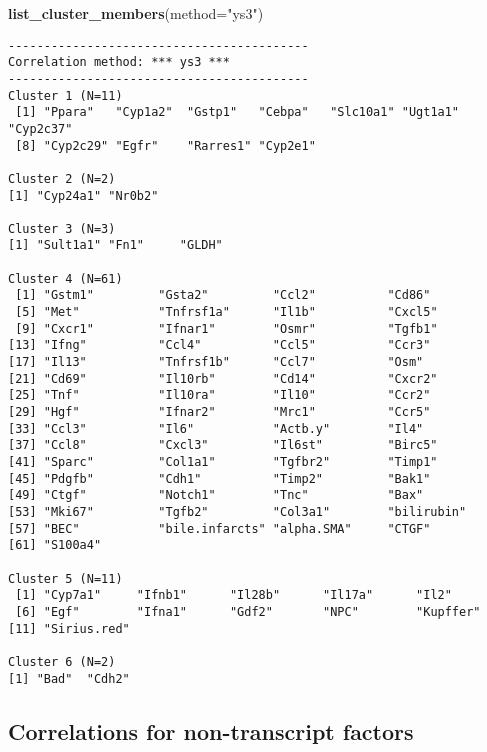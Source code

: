 \documentclass[]{article}
\newenvironment{Shaded}{\begin{snugshade}}{\end{snugshade}}
\newcommand{\KeywordTok}[1]{\textcolor[rgb]{0.13,0.29,0.53}{\textbf{{#1}}}}
\newcommand{\DataTypeTok}[1]{\textcolor[rgb]{0.13,0.29,0.53}{{#1}}}
\newcommand{\StringTok}[1]{\textcolor[rgb]{0.31,0.60,0.02}{{#1}}}
\newcommand{\NormalTok}[1]{{#1}}
\begin{document}
\small

\begin{Shaded}
\begin{Highlighting}[]
\KeywordTok{list_cluster_members}\NormalTok{(}\DataTypeTok{method=}\StringTok{"ys3"}\NormalTok{)}
\end{Highlighting}
\end{Shaded}

\begin{verbatim}
------------------------------------------
Correlation method: *** ys3 ***
------------------------------------------
Cluster 1 (N=11)
 [1] "Ppara"   "Cyp1a2"  "Gstp1"   "Cebpa"   "Slc10a1" "Ugt1a1"  "Cyp2c37"
 [8] "Cyp2c29" "Egfr"    "Rarres1" "Cyp2e1" 

Cluster 2 (N=2)
[1] "Cyp24a1" "Nr0b2"  

Cluster 3 (N=3)
[1] "Sult1a1" "Fn1"     "GLDH"   

Cluster 4 (N=61)
 [1] "Gstm1"         "Gsta2"         "Ccl2"          "Cd86"         
 [5] "Met"           "Tnfrsf1a"      "Il1b"          "Cxcl5"        
 [9] "Cxcr1"         "Ifnar1"        "Osmr"          "Tgfb1"        
[13] "Ifng"          "Ccl4"          "Ccl5"          "Ccr3"         
[17] "Il13"          "Tnfrsf1b"      "Ccl7"          "Osm"          
[21] "Cd69"          "Il10rb"        "Cd14"          "Cxcr2"        
[25] "Tnf"           "Il10ra"        "Il10"          "Ccr2"         
[29] "Hgf"           "Ifnar2"        "Mrc1"          "Ccr5"         
[33] "Ccl3"          "Il6"           "Actb.y"        "Il4"          
[37] "Ccl8"          "Cxcl3"         "Il6st"         "Birc5"        
[41] "Sparc"         "Col1a1"        "Tgfbr2"        "Timp1"        
[45] "Pdgfb"         "Cdh1"          "Timp2"         "Bak1"         
[49] "Ctgf"          "Notch1"        "Tnc"           "Bax"          
[53] "Mki67"         "Tgfb2"         "Col3a1"        "bilirubin"    
[57] "BEC"           "bile.infarcts" "alpha.SMA"     "CTGF"         
[61] "S100a4"       

Cluster 5 (N=11)
 [1] "Cyp7a1"     "Ifnb1"      "Il28b"      "Il17a"      "Il2"       
 [6] "Egf"        "Ifna1"      "Gdf2"       "NPC"        "Kupffer"   
[11] "Sirius.red"

Cluster 6 (N=2)
[1] "Bad"  "Cdh2"
\end{verbatim}

\normalsize

\subsection{Correlations for non-transcript
factors}\label{correlations-for-non-transcript-factors}
\end{document}
